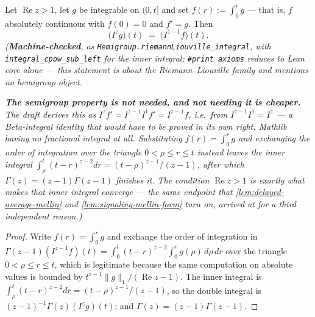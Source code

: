 \begin{lemma}\label{lem:fractional-integral-derivative}
\leanok
Let $\operatorname{Re} z > 1$, let $g$ be integrable on $(0,t]$ and set
$f(r) := \int_0^r g$ --- that is, $f$ absolutely continuous with $f(0) = 0$ and $f' = g$. Then
\[
  \bigl(I^{z} g\bigr)(t) \;=\; \bigl(I^{z-1} f\bigr)(t).
\]
\statusT\quad\emph{(\textbf{Machine-checked}, as \texttt{Hemigroup.riemannLiouville\_integral},
with \texttt{integral\_cpow\_sub\_left} for the inner integral; \texttt{\#print axioms} reduces to
Lean core alone --- this statement is about the Riemann--Liouville family and mentions no
hemigroup object.}

\emph{\textbf{The semigroup property is not needed, and not needing it is cheaper.} The draft
derives this as $I^zf' = I^{z-1}I^1f' = I^{z-1}f$, i.e.\ from $I^{z-1}I^1 = I^z$ --- a Beta-integral
identity that would have to be proved in its own right, Mathlib having no fractional integral at
all. Substituting $f(r) = \int_0^r g$ and exchanging the order of integration over the triangle
$0 < \rho \le r \le t$ instead leaves the inner integral
$\int_\rho^t (t-r)^{z-2}dr = (t-\rho)^{z-1}/(z-1)$, after which $\Gamma(z) = (z-1)\Gamma(z-1)$
finishes it. The condition $\operatorname{Re} z > 1$ is exactly what makes that inner integral
converge --- the same endpoint that \ref{lem:delayed-average-mellin} and
\ref{lem:signaling-mellin-form} turn on, arrived at for a third independent reason.)}
\end{lemma}

\begin{proof}
\leanok
Write $f(r) = \int_0^r g$ and exchange the order of integration in
$\Gamma(z-1)(I^{z-1}f)(t) = \int_0^t (t-r)^{z-2}\int_0^r g(\rho)\,d\rho\,dr$ over the triangle
$0 < \rho \le r \le t$, which is legitimate because the same computation on absolute values is
bounded by $t^{z-1}\|g\|_1/(\operatorname{Re} z - 1)$. The inner integral is
$\int_\rho^t (t-r)^{z-2}dr = (t-\rho)^{z-1}/(z-1)$, so the double integral is
$(z-1)^{-1}\Gamma(z)(I^zg)(t)$; and $\Gamma(z) = (z-1)\Gamma(z-1)$.
\end{proof}

